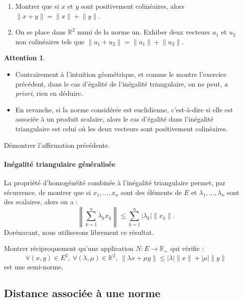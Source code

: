 \documentclass[french]{article}
\newcommand{\R}{\mathbb{R}}
\newcommand{\K}{\mathbb{K}}
\theoremstyle{plain}
\theoremstyle{definition}
\newtheorem*{attention}{Attention}
\theoremstyle{remark}
\begin{document}
\begin{exo}
	\begin{enumerate}
		\item Montrer que si $x$ et $y$ sont positivement colinéaires, alors $\lVert x+y\rVert=\lVert x\rVert+\lVert y\rVert$.
		\item On se place dans $\R^2$ muni de la norme un. Exhiber deux vecteurs $u_1$ et $u_2$ non colinéaires tels que $\lVert u_1+u_2\rVert=\lVert u_1\rVert+\lVert u_2\rVert$.
	\end{enumerate}
\end{exo}

\begin{attention}
\begin{itemize}
	\item Contrairement à l'intuition géométrique, et comme le montre l'exercice précédent, dans le cas d'égalité de l'inégalité triangulaire, on ne peut, \textit{a priori}, rien en déduire.
	\item En revanche, si la norme considérée est euclidienne, c'est-à-dire si elle est associée à un produit scalaire, alors le cas d'égalité dans l'inégalité triangulaire est celui où les deux vecteurs sont positivement colinéaires.
\end{itemize}
\end{attention}

\begin{exo}
	Démontrer l'affirmation précédente.
\end{exo}

\paragraph{Inégalité triangulaire généralisée} La propriété d'homogénéité combinée à l'inégalité triangulaire permet, par récurrence, de montrer que si $x_1,\ldots,x_n$ sont des éléments de $E$ et $\lambda_1,\ldots,\lambda_n$ sont des scalaires, alors on a : $$\left\lVert\sum_{k=1}^{n}\lambda_kx_k\right\rVert\leqslant\sum_{k=1}^{n}\lvert\lambda_k\rvert\lVert x_k\rVert.$$ Dorénavant, nous utiliserons librement ce résultat.

\begin{exo}
	Montrer réciproquement qu'une application $N:E\to\R_+$ qui vérifie : $$\forall (x,y)\in E^2,\ \forall (\lambda,\mu)\in\K^2,\ \lVert\lambda x+\mu y\rVert\leqslant\lvert\lambda\rvert\lVert x\rVert+\lvert\mu\rvert\lVert y\rVert$$ est une semi-norme.
\end{exo}

\subsection{Distance associée à une norme}
\end{document}

